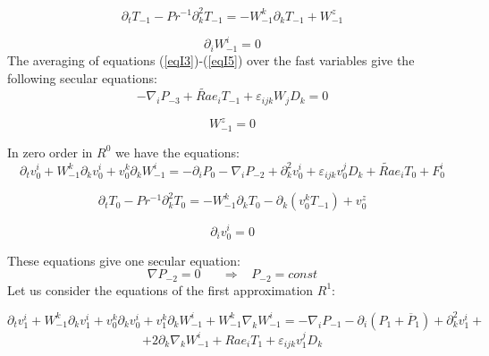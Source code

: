 \documentclass [12pt]{article}
\begin{document}
  \begin{equation}\label{eqI4} \partial
_{t} T_{-1} -Pr^{-1} \partial _{k}^{2} T_{-1} =-W_{-1}^{k} \partial _{k} T_{-1} + W_{-1}^{z} \end{equation}

\begin{equation}\label{eqI5} \partial _{i} W_{-1}^{i} =0 \end{equation}
The averaging of equations (\ref{eqI3})-(\ref{eqI5}) over the fast variables give the following secular equations:
\begin{equation}\label{eqI6}-\nabla _{i} P_{-3} +\widetilde{Ra}e_{i} T_{-1} +\varepsilon _{ijk} W_{j} D_{k} =0 \end{equation}

\begin{equation}\label{eqI7} W_{-1}^{z} =0 \end{equation}

In zero order in $R^{0} $ we have the equations:
\begin{equation}\label{eqI8} \partial _{t} v_{0}^{i} +W_{-1}^{k} \partial _{k} v_{0}^{i} +v_{0}^{k} \partial
_{k} W_{-1}^{i} =-\partial _{i} P_{0} -\nabla _{i} P_{-2} +\partial _{k}^{2} v_{0}^{i}
+ \varepsilon _{ijk} v_{0}^{j} D_{k} +\widetilde{Ra}e_{i} T_{0} +F_{0}^{i} \end{equation}

\begin{equation}\label{eqI9}\partial _{t} T_{0} -Pr^{-1} \partial _{k}^{2} T_{0} =-W_{-1}^{k} \partial _{k}
T_{0}-\partial _{k}(v_{0}^{k} T_{-1}) +v_{0}^{z} \end{equation}

\begin{equation}\label{eqI10}\partial
_{i} v_{0}^{i} =0 \end{equation}

These equations give one secular equation:
\begin{equation}\label{eqI11}
  \nabla P_{-2} =0\; \; \; \; \; \; \Rightarrow \; \; \; P_{-2} =const
\end{equation}
Let us consider the equations of the first approximation $R^{1} $:

\[ \partial _{t} v_{1}^{i} +W_{-1}^{k} \partial _{k} v_{1}^{i}
+v_{0}^{k} \partial _{k} v_{0}^{i} +v_{1}^{k} \partial _{k} W_{-1}^{i} +W_{-1}^{k}
\nabla _{k} W_{-1}^{i} =-\nabla _{i} P_{-1} -\partial _{i} \left(P_{1} +\overline{P}_{1}
\right)+\partial _{k}^{2} v_{1}^{i} +\]
\begin{equation}\label{eqI12}
{+2\partial _{k} \nabla _{k} W_{-1}^{i}
+Rae_{i}T_{1}+\varepsilon _{ijk} v_{1}^{j} D_{k} }  \end{equation}
\end{document}
